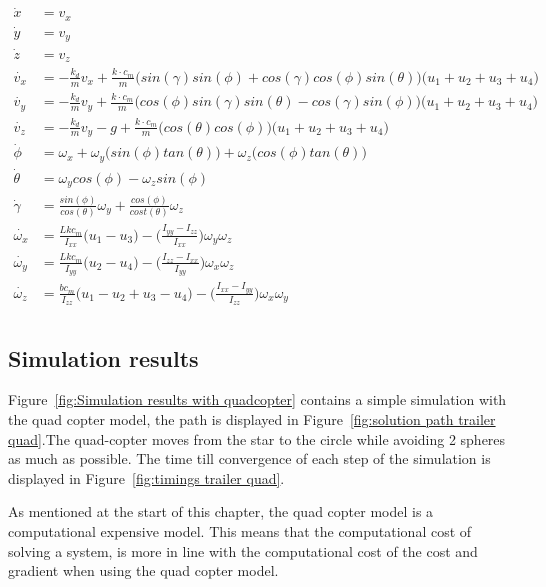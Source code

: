 \begin{equation}
	\begin{aligned}
		\dot{x} &= v_x \\
		\dot{y} &= v_y \\
		\dot{z} &= v_z \\
		\dot{v_x} &= -\frac{k_d}{m}v_x + \frac{k \cdot c_m}{m}\Big(sin(\gamma)sin(\phi)+cos(\gamma)cos(\phi)sin(\theta)\Big)\Big(u_1 + u_2 + u_3 + u_4\Big) \\
		\dot{v_y} &= -\frac{k_d}{m}v_y + \frac{k \cdot c_m}{m}\Big(cos(\phi)sin(\gamma)sin(\theta)-cos(\gamma)sin(\phi)\Big)\Big(u_1 + u_2 + u_3 + u_4\Big) \\
		\dot{v_z} &= -\frac{k_d}{m}v_y -g + \frac{k \cdot c_m}{m}\Big(cos(\theta)cos(\phi)\Big)\Big(u_1 + u_2 + u_3 + u_4\Big) \\
		\dot{\phi} &= \omega_x + \omega_y\Big( sin(\phi)tan(\theta) \Big) + \omega_z \Big( cos(\phi) tan(\theta) \Big) \\
		\dot{\theta} &= \omega_y cos(\phi) - \omega_z sin(\phi) \\
		\dot{\gamma} &= \frac{sin(\phi)}{cos(\theta)}\omega_y + \frac{cos(\phi)}{cost(\theta)} \omega_z \\
		\dot{\omega_x} &= \frac{Lkc_m}{I_{xx}}\Big( u_1 - u_3 \Big) - \Big( \frac{I_{yy}-I_{zz}}{I_{xx}} \Big) \omega_y \omega_z\\
		\dot{\omega_y} &= \frac{Lkc_m}{I_{yy}}\Big( u_2 - u_4 \Big) - \Big( \frac{I_{zz}-I_{xx}}{I_{yy}} \Big) \omega_x \omega_z\\
		\dot{\omega_z} &= \frac{bc_m}{I_{zz}}\Big( u_1 - u_2 + u_3 - u_4 \Big) - \Big( \frac{I_{xx}-I_{yy}}{I_{zz}} \Big) \omega_x \omega_y\\
	\end{aligned}
	\label{eq:mathematical model quadcopter}
\end{equation}

\subsection{Simulation results}
Figure~\ref{fig:Simulation results with quadcopter} contains a simple simulation with the quad copter model, the path is displayed in Figure~\ref{fig:solution path trailer quad}.The quad-copter moves from the star to the circle while avoiding 2 spheres as much as possible. The time till convergence of each step of the simulation is displayed in Figure~\ref{fig:timings trailer quad}.

As mentioned at the start of this chapter, the quad copter model is a computational expensive model. This means that the computational cost of solving a system, is more in line with the computational cost of the cost and gradient when using the quad copter model.

